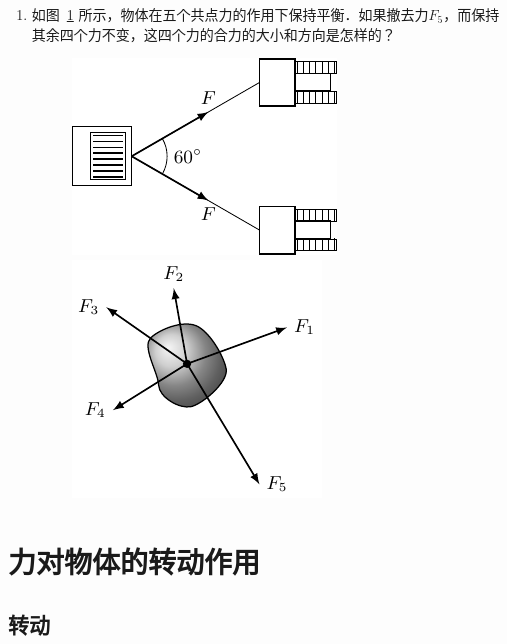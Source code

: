 \begin{enumerate}
    \item 如图~\ref{fig_A_6-5} 所示，物体在五个共点力的作用下保持平衡．如果撤去力$F_5$，而保持其余四个力不变，这四个力的合力的大小和方向是怎样的？
\begin{figure}[htbp]
    \centering
    \begin{minipage}[t]{0.48\textwidth}
        \centering\includegraphics{fig/A/6-4.pdf}
        \caption{}\label{fig_A_6-4}
    \end{minipage}
    \begin{minipage}[t]{0.48\textwidth}
        \centering\includegraphics{fig/A/6-5.pdf}
        \caption{}\label{fig_A_6-5}
    \end{minipage}
\end{figure}


\end{enumerate}

\section{力对物体的转动作用}
\subsection{转动}

